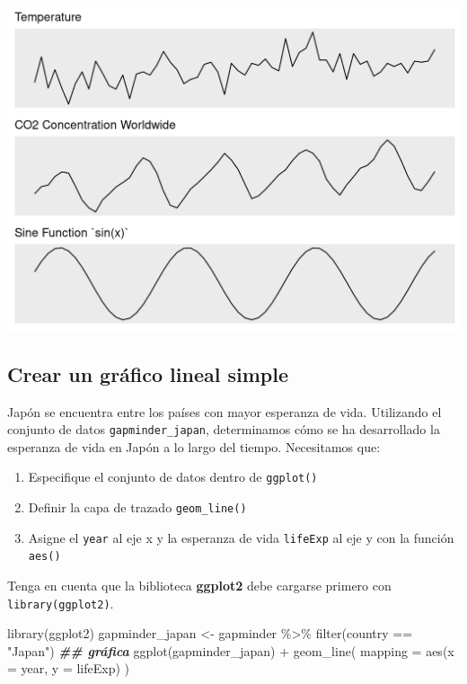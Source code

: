 \documentclass[
]{book}
\newenvironment{Shaded}{\begin{snugshade}}{\end{snugshade}}
\newcommand{\AttributeTok}[1]{\textcolor[rgb]{0.77,0.63,0.00}{#1}}
\newcommand{\DocumentationTok}[1]{\textcolor[rgb]{0.56,0.35,0.01}{\textbf{\textit{#1}}}}
\newcommand{\FunctionTok}[1]{\textcolor[rgb]{0.00,0.00,0.00}{#1}}
\newcommand{\NormalTok}[1]{#1}
\newcommand{\OtherTok}[1]{\textcolor[rgb]{0.56,0.35,0.01}{#1}}
\newcommand{\SpecialCharTok}[1]{\textcolor[rgb]{0.00,0.00,0.00}{#1}}
\newcommand{\StringTok}[1]{\textcolor[rgb]{0.31,0.60,0.02}{#1}}
\providecommand{\tightlist}{%
  \setlength{\itemsep}{0pt}\setlength{\parskip}{0pt}}
\begin{document}
\includegraphics{img/geo1.png}

\hypertarget{crear-un-gruxe1fico-lineal-simple}{%
\subsection{Crear un gráfico lineal simple}\label{crear-un-gruxe1fico-lineal-simple}}

Japón se encuentra entre los países con mayor esperanza de vida. Utilizando el conjunto de datos \texttt{gapminder\_japan}, determinamos cómo se ha desarrollado la esperanza de vida en Japón a lo largo del tiempo. Necesitamos que:

\begin{enumerate}
\def\labelenumi{\arabic{enumi}.}
\tightlist
\item
  Especifique el conjunto de datos dentro de \texttt{ggplot()}
\item
  Definir la capa de trazado \texttt{geom\_line()}
\item
  Asigne el \texttt{year} al eje x y la esperanza de vida \texttt{lifeExp} al eje y con la función \texttt{aes()}
\end{enumerate}

Tenga en cuenta que la biblioteca \textbf{ggplot2} debe cargarse primero con \texttt{library(ggplot2)}.

\begin{Shaded}
\begin{Highlighting}[]
\FunctionTok{library}\NormalTok{(ggplot2)}
\NormalTok{gapminder\_japan }\OtherTok{\textless{}{-}}\NormalTok{ gapminder }\SpecialCharTok{\%\textgreater{}\%}
  \FunctionTok{filter}\NormalTok{(country }\SpecialCharTok{==} \StringTok{"Japan"}\NormalTok{)}
\DocumentationTok{\#\# gráfica}
\FunctionTok{ggplot}\NormalTok{(gapminder\_japan) }\SpecialCharTok{+} 
  \FunctionTok{geom\_line}\NormalTok{(}
    \AttributeTok{mapping =} \FunctionTok{aes}\NormalTok{(}\AttributeTok{x =}\NormalTok{ year, }\AttributeTok{y =}\NormalTok{ lifeExp)}
\NormalTok{)}
\end{Highlighting}
\end{Shaded}
\end{document}
